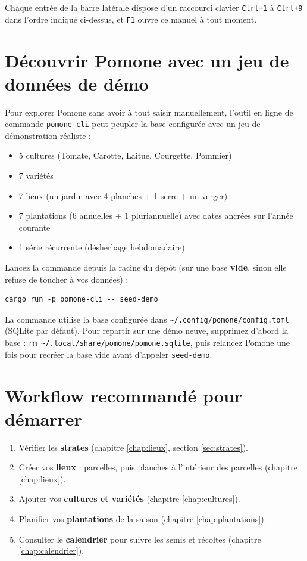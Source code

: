 \begin{notebox}
Chaque entrée de la barre latérale dispose d'un raccourci clavier \texttt{Ctrl+1} à \texttt{Ctrl+9} dans l'ordre indiqué ci-dessus, et \texttt{F1} ouvre ce manuel à tout moment.
\end{notebox}

\section{Découvrir Pomone avec un jeu de données de démo}

Pour explorer Pomone sans avoir à tout saisir manuellement, l'outil en ligne de commande \texttt{pomone-cli} peut peupler la base configurée avec un jeu de démonstration réaliste :

\begin{itemize}
  \item 5 cultures (Tomate, Carotte, Laitue, Courgette, Pommier)
  \item 7 variétés
  \item 7 lieux (un jardin avec 4 planches + 1 serre + un verger)
  \item 7 plantations (6 annuelles + 1 pluriannuelle) avec dates ancrées sur l'année courante
  \item 1 série récurrente (désherbage hebdomadaire)
\end{itemize}

Lancez la commande depuis la racine du dépôt (sur une base \textbf{vide}, sinon elle refuse de toucher à vos données) :

\begin{verbatim}
cargo run -p pomone-cli -- seed-demo
\end{verbatim}

La commande utilise la base configurée dans \texttt{\textasciitilde/.config/pomone/config.toml} (SQLite par défaut). Pour repartir sur une démo neuve, supprimez d'abord la base : \texttt{rm \textasciitilde/.local/share/pomone/pomone.sqlite}, puis relancez Pomone une fois pour recréer la base vide avant d'appeler \texttt{seed-demo}.

\section{Workflow recommandé pour démarrer}

\begin{enumerate}
  \item Vérifier les \textbf{strates} (chapitre \ref{chap:lieux}, section \ref{sec:strates}).
  \item Créer vos \textbf{lieux} : parcelles, puis planches à l'intérieur des parcelles (chapitre \ref{chap:lieux}).
  \item Ajouter vos \textbf{cultures et variétés} (chapitre \ref{chap:cultures}).
  \item Planifier vos \textbf{plantations} de la saison (chapitre \ref{chap:plantations}).
  \item Consulter le \textbf{calendrier} pour suivre les semis et récoltes (chapitre \ref{chap:calendrier}).
\end{enumerate}

